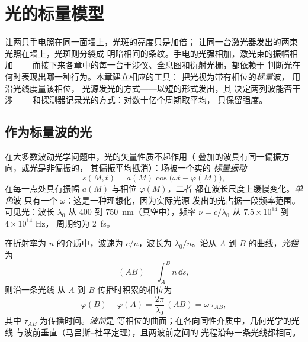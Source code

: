 \chapter{光的标量模型}\label{ch:b2:scalar-light-model}

让两只手电照在同一面墙上，光斑的亮度只是加倍；
让同一台激光器发出的两束光照在墙上，光斑则分裂成
明暗相间的条纹。手电的光强相加，激光束的振幅相加——
而接下来各章中的每一台干涉仪、全息图和衍射光栅，都依赖于
判断光在何时表现出哪一种行为。本章建立相应的工具：
把光视为带有相位的\emph{标量}波，
用\emph{}沿光线度量该相位，
光源发光的方式——以短的形式发出，其
\emph{}决定两列波能否干涉——
和探测器记录光的方式：对数十亿个周期取平均，
只保留强度。

\section{作为标量波的光}

\begin{definition}\label{def:b2:scalar-light-model:scalar}
在大多数波动光学问题中，光的矢量性质不起作用（
叠加的波具有同一偏振方向，或光是非偏振的，
其偏振平均抵消）：场被一个实的
\emph{标量振动}
\[
s(M, t) = a(M)\cos\bigl(\omega t - \varphi(M)\bigr) ,
\]
在每一点处具有振幅 $a(M)$ 与相位 $\varphi(M)$，二者
都在波长尺度上缓慢变化。\emph{单色}波
只有一个 $\omega$：这是一种理想化，因为实际光源
发出的光占据一段频率范围。可见光：波长 $\lambda_0$ 从 $400$ 到
\qty{750}{nm}（真空中），频率 $\nu = c/\lambda_0$ 从 $7.5 \times 10^{14}$ 到 $4 \times 10^{14}$ Hz，
周期约为 \qty{2}{fs}。
\end{definition}

\begin{definition}[光程与相位]\label{def:b2:scalar-light-model:path}
在折射率为 $n$ 的介质中，波速为 $c/n$，波长为
$\lambda_0/n$。沿从 $A$ 到 $B$ 的曲线，\emph{光程}为
\[
(AB) = \int_A^Bn\,\dd s ,
\]
则沿一条光线
从 $A$ 到 $B$ 传播时积累的相位为
\[
\varphi(B) - \varphi(A) = \frac{2\pi}{\lambda_0}\,(AB) = \omega\,\tau_{AB} ,
\]
其中 $\tau_{AB}$ 为传播时间。\emph{波前}是
等相位的曲面；在各向同性介质中，几何光学的光线
与波前垂直（马吕斯–杜平定理），且两波前之间的
光程沿每一条光线都相同。
\end{definition}

